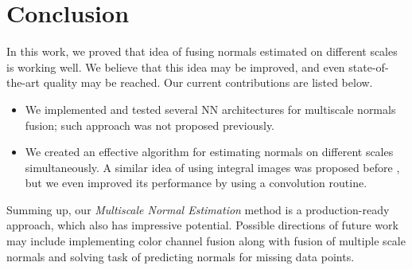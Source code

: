\chapter{Conclusion}

In this work, we proved that idea of fusing normals estimated on different scales is working well. We believe that this idea may be improved, and even state-of-the-art quality may be reached. Our current contributions are listed below.
\begin{itemize}
    \item We implemented and tested several NN architectures for multiscale normals fusion; such approach was not proposed previously.
    \item We created an effective algorithm for estimating normals on different scales simultaneously. A similar idea of using integral images was proposed before \cite{adaptive-neighborhood}, but we even improved its performance by using a convolution routine.
\end{itemize}

Summing up, our \textit{Multiscale Normal Estimation} method is a production-ready approach, which also has impressive potential. Possible directions of future work may include implementing color channel fusion along with fusion of multiple scale normals and solving task of predicting normals for missing data points.